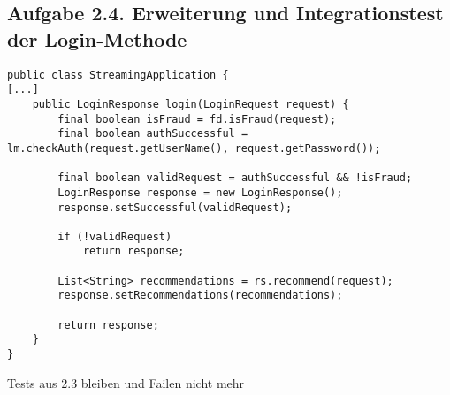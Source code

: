 \subsection*{Aufgabe 2.4. Erweiterung und Integrationstest der Login-Methode}

\begin{lstlisting}[style=javastyle, caption=Erweiterung der login()-Methode]
public class StreamingApplication {
[...]
    public LoginResponse login(LoginRequest request) {
        final boolean isFraud = fd.isFraud(request);
        final boolean authSuccessful = lm.checkAuth(request.getUserName(), request.getPassword());

        final boolean validRequest = authSuccessful && !isFraud;
        LoginResponse response = new LoginResponse();
        response.setSuccessful(validRequest);

        if (!validRequest)
            return response;

        List<String> recommendations = rs.recommend(request);
        response.setRecommendations(recommendations);

        return response;
    }
}

\end{lstlisting}
Tests aus 2.3 bleiben und Failen nicht mehr

